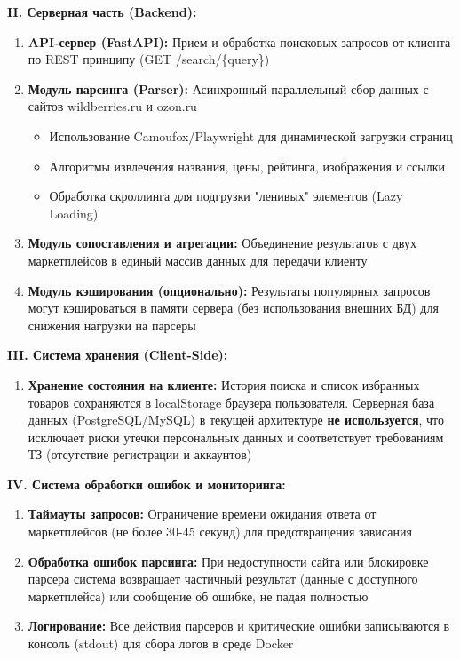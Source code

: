 \documentclass[a4paper,12pt]{article}
\begin{document}
\textbf{II. Серверная часть (Backend):}
\begin{enumerate}
	\item \textbf{API-сервер (FastAPI):} Прием и обработка поисковых запросов от клиента по REST принципу (GET /search/\{query\})
	\item \textbf{Модуль парсинга (Parser):} Асинхронный параллельный сбор данных с сайтов wildberries.ru и ozon.ru
	\begin{itemize}
		\item Использование Camoufox/Playwright для динамической загрузки страниц
		\item Алгоритмы извлечения названия, цены, рейтинга, изображения и ссылки
		\item Обработка скроллинга для подгрузки "ленивых" элементов (Lazy Loading)
	\end{itemize}
	\item \textbf{Модуль сопоставления и агрегации:} Объединение результатов с двух маркетплейсов в единый массив данных для передачи клиенту
	\item \textbf{Модуль кэширования (опционально):} Результаты популярных запросов могут кэшироваться в памяти сервера (без использования внешних БД) для снижения нагрузки на парсеры
\end{enumerate}

\textbf{III. Система хранения (Client-Side):}
\begin{enumerate}
	\item \textbf{Хранение состояния на клиенте:} История поиска и список избранных товаров сохраняются в localStorage браузера пользователя. Серверная база данных (PostgreSQL/MySQL) в текущей архитектуре \textbf{не используется}, что исключает риски утечки персональных данных и соответствует требованиям ТЗ (отсутствие регистрации и аккаунтов)
\end{enumerate}

\textbf{IV. Система обработки ошибок и мониторинга:}
\begin{enumerate}
	\item \textbf{Таймауты запросов:} Ограничение времени ожидания ответа от маркетплейсов (не более 30-45 секунд) для предотвращения зависания
	\item \textbf{Обработка ошибок парсинга:} При недоступности сайта или блокировке парсера система возвращает частичный результат (данные с доступного маркетплейса) или сообщение об ошибке, не падая полностью
	\item \textbf{Логирование:} Все действия парсеров и критические ошибки записываются в консоль (stdout) для сбора логов в среде Docker
\end{enumerate}
\end{document}
